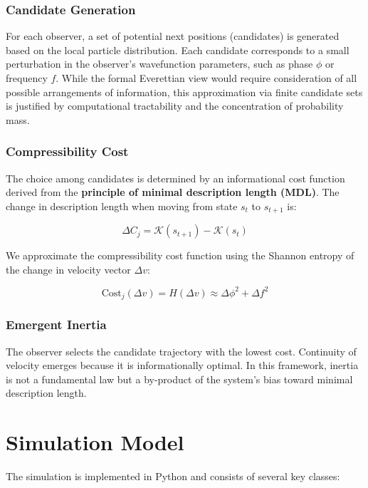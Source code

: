 \documentclass[11pt]{article}
\begin{document}
\subsubsection*{Candidate Generation}
For each observer, a set of potential next positions (candidates) is generated based on the local particle distribution. Each candidate corresponds to a small perturbation in the observer’s wavefunction parameters, such as phase $\phi$ or frequency $f$. While the formal Everettian view would require consideration of all possible arrangements of information, this approximation via finite candidate sets is justified by computational tractability and the concentration of probability mass.

\subsubsection*{Compressibility Cost}
The choice among candidates is determined by an informational cost function derived from the \textbf{principle of minimal description length (MDL)}. The change in description length when moving from state $s_t$ to $s_{t+1}$ is:

\begin{equation}
\Delta C_j = \mathcal{K}(s_{t+1}) - \mathcal{K}(s_t)
\end{equation}

We approximate the compressibility cost function using the Shannon entropy of the change in velocity vector $\Delta v$:

\begin{equation}
\text{Cost}_j(\Delta v) = H(\Delta v) \approx \Delta \phi^2 + \Delta f^2
\end{equation}

\subsubsection*{Emergent Inertia}
The observer selects the candidate trajectory with the lowest cost. Continuity of velocity emerges because it is informationally optimal. In this framework, inertia is not a fundamental law but a by-product of the system’s bias toward minimal description length.

\section{Simulation Model}

The simulation is implemented in Python and consists of several key classes:
\end{document}
